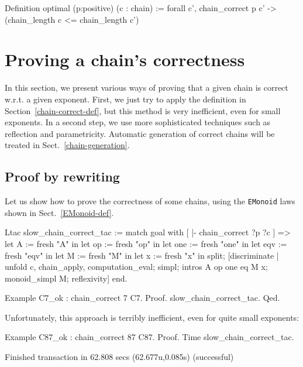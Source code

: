  \begin{Coqsrc}
Definition optimal (p:positive) (c : chain) :=
 forall c', chain_correct p c' -> 
            (chain_length c <= chain_length c')%
 \end{Coqsrc}

\section{Proving a chain's correctness}
\label{chain-correctness-sect}
In this section, we present various ways of proving that a given chain is 
correct w.r.t. a given exponent. First, we just try to apply 
the definition in Section~\vref{chain-correct-def}, but this method is very 
inefficient, even for small exponents. In a second step, we use more sophisticated techniques such as reflection and parametricity. Automatic generation of correct chains will be treated in Sect.~\vref{chain-generation}.

\subsection{Proof by rewriting}
Let us show how to prove  the correctness of some chains, using
the \texttt{EMonoid} laws shown in Sect.~\vref{EMonoid-def}. 

\begin{Coqsrc}
Ltac slow_chain_correct_tac :=
  match goal with 
      [ |- chain_correct ?p ?c ] =>
      let A := fresh "A" in
      let op := fresh "op" in
      let one := fresh "one" in
      let eqv := fresh "eqv" in
      let M := fresh "M" in
      let x := fresh "x"
      in  split;
        [discriminate | 
         unfold c, chain_apply, computation_eval; simpl;
         intros A op one eq M x; monoid_simpl M; reflexivity]
  end.


Example C7_ok : chain_correct 7 C7.
Proof.
   slow_chain_correct_tac.
Qed.
\end{Coqsrc}

Unfortunately, this approach is terribly inefficient, even for quite small exponents:


\begin{Coqsrc}
Example C87_ok : chain_correct 87 C87.
Proof.
 Time  slow_chain_correct_tac. 
\end{Coqsrc}

\begin{Coqanswer}
 Finished transaction in 62.808 secs (62.677u,0.085s) (successful)   
 \end{Coqanswer}


